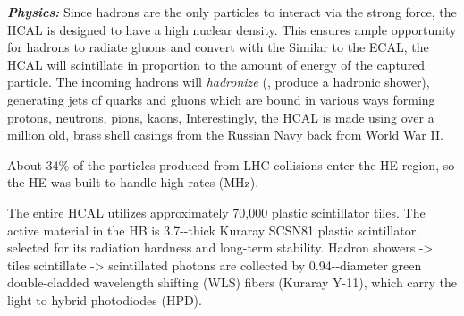 \textit{\textbf{Physics:}}
Since hadrons are the only particles to interact via the strong force, the HCAL is designed to have a high nuclear density.
This ensures ample opportunity for hadrons to radiate gluons and convert  with the Similar to the ECAL, the HCAL will scintillate in proportion to the amount of energy of the captured particle. 
The incoming hadrons will \emph{hadronize} (\ie, produce a hadronic shower), generating jets of quarks and gluons which are bound in various ways forming protons, neutrons, pions, kaons, \etc
Interestingly, the HCAL is made using over a million old, brass shell casings from the Russian Navy back from World War II.

About 34\% of the particles produced from LHC \pp collisions enter the HE region, so the HE was built to handle high rates (MHz).

The entire HCAL utilizes approximately 70,000 plastic scintillator tiles.
The active material in the HB is 3.7-\mm-thick Kuraray SCSN81 plastic scintillator, selected for its radiation hardness and long-term stability.
Hadron showers -> tiles scintillate -> scintillated photons are collected by 0.94-\mm-diameter green double-cladded wavelength shifting (WLS) fibers (Kuraray Y-11), which carry the light to hybrid photodiodes (HPD).

